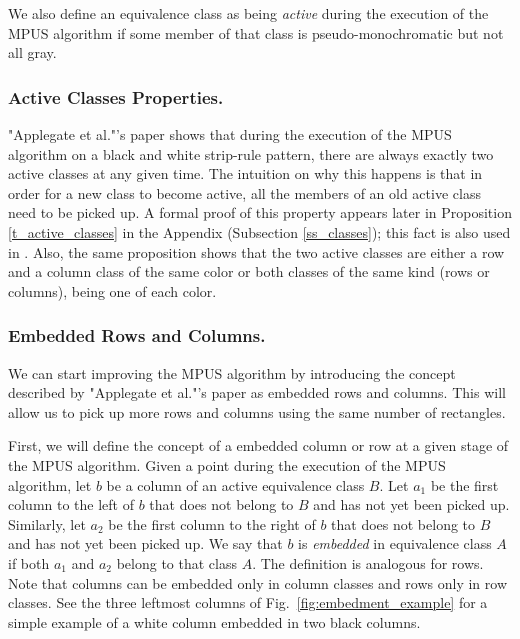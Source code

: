 
We also define an equivalence class as being {\em active} during the execution of the MPUS algorithm if some member of that class is pseudo-monochromatic
but not all gray.

\subsubsection{Active Classes Properties.}
"Applegate et al."'s paper shows that during the execution of the MPUS algorithm on a black and white strip-rule pattern, there are always exactly two active classes at any given time.
The intuition on why this happens is that in order for a new class to become active, all the members of an old active class need to be picked up.
A formal proof of this property appears later in
Proposition \ref{t_active_classes} in the Appendix
(Subsection \ref{ss_classes});
this fact is also used in \cite{ACJKLW07}.
Also, the same proposition shows that
the two active classes are either a row and a column
class of the same color or both classes of the same kind (rows or columns),
 being one of each color.

\subsubsection{Embedded Rows and Columns.}
We can start improving the MPUS algorithm by introducing the concept described by "Applegate et al."'s paper as embedded rows and columns. This will allow us to pick up more rows and columns using the same number of rectangles.

First, we will define the concept of a embedded column or row at a given stage of the MPUS algorithm.
Given a point during the execution of the MPUS algorithm,
let $b$ be a column of an active equivalence class $B$.
Let $a_{1}$ be the first column to the left of $b$ that does not belong to $B$ and has not yet been picked up.
Similarly, let $a_{2}$ be the first column to the right of $b$ that does not belong to $B$ and has not yet been picked up.
We say that $b$ is {\em embedded}
 in equivalence class $A$ if both $a_{1}$ and $a_{2}$ belong to that class $A$. The definition is analogous for rows. Note that columns can be embedded only in column classes and rows only in row classes. See the three leftmost columns of Fig.~\ref{fig:embedment_example} for a simple example of a white column embedded in two black columns.

